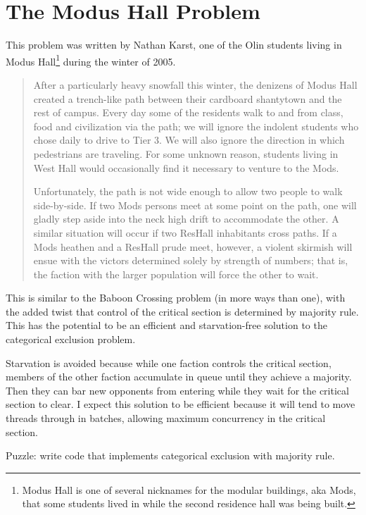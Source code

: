\documentclass{book}
\begin{document}
\section{The Modus Hall Problem}

This problem was written by Nathan Karst, one of the Olin students
living in Modus Hall\footnote{Modus Hall is one of several nicknames
    for the modular buildings, aka Mods, that some students lived in while
    the second residence hall was being built.} during the winter of 2005.

\begin{quote}
    After a particularly heavy snowfall this winter, the denizens of Modus
    Hall created a trench-like path between their cardboard shantytown and
    the rest of campus.  Every day some of the residents walk to and from
    class, food and civilization via the path; we will ignore the
    indolent students who chose daily to drive to Tier 3.  We will also
    ignore the direction in which pedestrians are traveling.  For some
    unknown reason, students living in West Hall would occasionally find it
    necessary to venture to the Mods.

    Unfortunately, the path is not wide enough to allow two people
    to walk side-by-side.  If two Mods persons meet at some point on the
    path, one will gladly step aside into the neck high drift to accommodate
    the other.  A similar situation will occur if two ResHall inhabitants
    cross paths.  If a Mods heathen and a ResHall prude meet, however, a
    violent skirmish will ensue with the victors determined solely by
    strength of numbers; that is, the faction with the larger population will
    force the other to wait.
\end{quote}

This is similar to the Baboon Crossing problem (in more ways than
one), with the added twist that control of the critical section is
determined by majority rule.  This has the potential to be an
efficient and starvation-free solution to the categorical exclusion
problem.

Starvation is avoided because while one faction controls the critical
section, members of the other faction accumulate in queue until they
achieve a majority.  Then they can bar new opponents from entering
while they wait for the critical section to clear.  I expect this
solution to be efficient because it will tend to move threads through
in batches, allowing maximum concurrency in the critical section.

Puzzle: write code that implements categorical exclusion with
majority rule.
\end{document}
